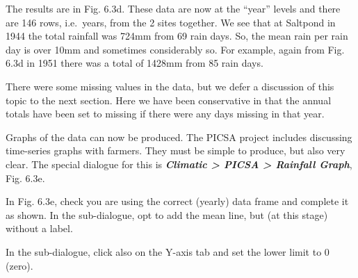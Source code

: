 \documentclass[
  letterpaper,
  DIV=11,
  numbers=noendperiod]{scrreprt}
\begin{document}
The results are in Fig. 6.3d. These data are now at the ``year'' levels
and there are 146 rows, i.e.~years, from the 2 sites together. We see
that at Saltpond in 1944 the total rainfall was 724mm from 69 rain days.
So, the mean rain per rain day is over 10mm and sometimes considerably
so. For example, again from Fig. 6.3d in 1951 there was a total of
1428mm from 85 rain days.

There were some missing values in the data, but we defer a discussion of
this topic to the next section. Here we have been conservative in that
the annual totals have been set to missing if there were any days
missing in that year.

Graphs of the data can now be produced. The PICSA project includes
discussing time-series graphs with farmers. They must be simple to
produce, but also very clear. The special dialogue for this is
\textbf{\emph{Climatic \textgreater{} PICSA \textgreater{} Rainfall
Graph}}, Fig. 6.3e.

In Fig. 6.3e, check you are using the correct (yearly) data frame and
complete it as shown. In the sub-dialogue, opt to add the mean line, but
(at this stage) without a label.

In the sub-dialogue, click also on the Y-axis tab and set the lower
limit to 0 (zero).
\end{document}
